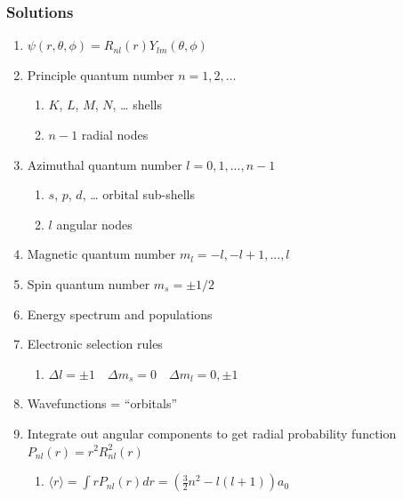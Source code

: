 \documentclass[11pt]{article}
\begin{document}
\subsubsection{Solutions}
\label{sec:orgcf1d5a9}
\begin{enumerate}
\item \(\psi(r,\theta,\phi)=R_{nl}(r)Y_{lm}(\theta,\phi)\)
\item Principle quantum number \(n=1,2,\ldots\)
\begin{enumerate}
\item \(K\), \(L\), \(M\), \(N\), \ldots{} shells
\item \(n-1\) radial nodes
\end{enumerate}
\item Azimuthal quantum number \(l=0,1,...,n-1\)
\begin{enumerate}
\item \(s\), \(p\), \(d\), \ldots{} orbital sub-shells
\item \(l\) angular nodes
\end{enumerate}
\item Magnetic quantum number \(m_l=-l,-l+1,...,l\)
\item Spin quantum number \(m_s=\pm 1/2\)
\item Energy spectrum and populations
\item Electronic selection rules
\begin{enumerate}
\item \(\Delta l=\pm 1 \quad \Delta m_s =0 \quad \Delta m_l = 0,\pm 1\)
\end{enumerate}
\item Wavefunctions = ``orbitals''
\item Integrate out angular components to get radial probability function \(P_{nl}(r)=r^2 R_{nl}^2(r)\)
\begin{enumerate}
\item \(\langle r\rangle = \int r P_{nl}(r) dr = \left(\frac{3}{2}n^2-l(l+1)\right)a_0\)
\end{enumerate}
\end{enumerate}
\end{document}

